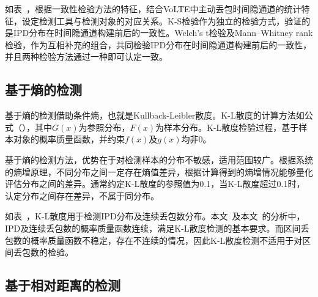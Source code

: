 如表\ ，根据一致性检验方法的特征，结合VoLTE中主动丢包时间隐通道的统计特征，设定检测工具与检测对象的对应关系。K-S检验作为独立的检验方式，验证的是IPD分布在时间隐通道构建前后的一致性。Welch's t检验及Mann–Whitney rank检验，作为互相补充的组合，共同检验IPD分布在时间隐通道构建前后的一致性，并且两种检验方法通过一种即可认定一致。

\subsection{基于熵的检测}
\label{chap:analyze:statistical:entropy}

基于熵的检测借助条件熵，也就是Kullback-Leibler散度。K-L散度的计算方法如公式（），其中$G(x)$为参照分布，$F(x)$为样本分布。K-L散度检验过程，基于样本对象的概率质量函数，并约束$f(x)$及$g(x)$均非0。

基于熵的检测方法，优势在于对检测样本的分布不敏感，适用范围较广。根据系统的熵增原理，不同分布之间一定存在熵值差异，根据计算得到的熵增情况能够量化评估分布之间的差异。通常约定K-L散度的参照值为0.1，当K-L散度超过0.1时，认定分布之间存在差异，不属于同分布。


如表\ ，K-L散度用于检测IPD分布及连续丢包数分布。本文\ 及本文\ 的分析中，IPD及连续丢包数的概率质量函数连续，满足K-L散度检测的基本要求。而区间丢包数的概率质量函数不稳定，存在不连续的情况，因此K-L散度检测不适用于对区间丢包数的检验。

\subsection{基于相对距离的检测}
\label{chap:analyze:statistical:distance}

